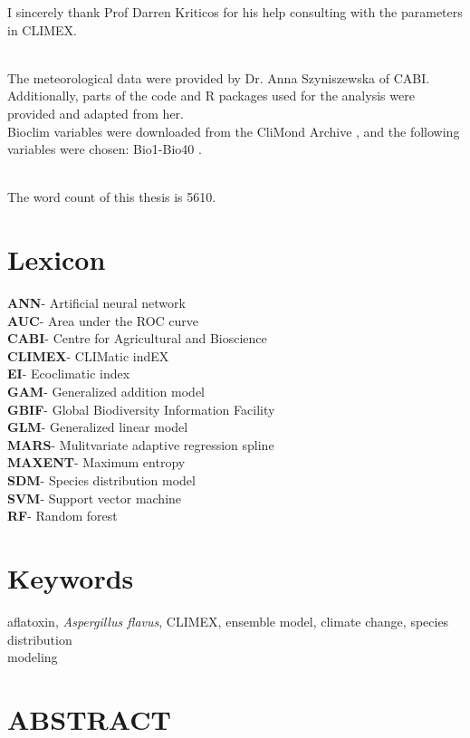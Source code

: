 \documentclass[a4paper,11]{article}
\begin{document}
I sincerely thank Prof Darren Kriticos for his help consulting with the parameters in CLIMEX.

\\
The meteorological data were provided by Dr. Anna Szyniszewska of CABI. Additionally, parts of the code and R packages used for the analysis were provided and adapted from her.
\\
Bioclim variables were downloaded from the CliMond Archive , and the following variables were chosen: Bio1-Bio40 \citep{hutchinson2009anuclim} \citep{kriticos2014extending}.

\\
The word count of this thesis is 5610.



\section*{Lexicon}
\textbf{ANN}- Artificial neural network \\
\textbf{AUC}- Area under the ROC curve \\
\textbf{CABI}- Centre for Agricultural and Bioscience \\
\textbf{CLIMEX}- CLIMatic indEX \\
\textbf{EI}- Ecoclimatic index \\
\textbf{GAM}- Generalized addition model \\
\textbf{GBIF}- Global Biodiversity Information Facility \\
\textbf{GLM}- Generalized linear model \\
\textbf{MARS}- Mulitvariate adaptive regression spline \\
\textbf{MAXENT}- Maximum entropy \\
\textbf{SDM}- Species distribution model \\
\textbf{SVM}- Support vector machine \\
\textbf{RF}- Random forest


\section*{Keywords}
aflatoxin, \textit{Aspergillus flavus}, CLIMEX, ensemble model, climate change, species distribution \\ modeling

\pagebreak

\centering

\section*{ABSTRACT}
\raggedright %
\end{document}
